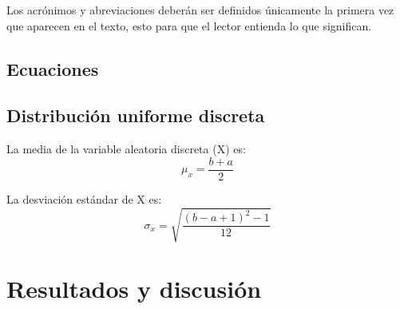     Los acrónimos y abreviaciones deberán ser definidos únicamente la primera vez que aparecen en el texto, esto para que el lector entienda lo que significan.
    
    \subsection{Ecuaciones}
    
    
    
    
    \subsection{Distribución uniforme discreta}
    La media de la variable aleatoria discreta (X) es:
    \begin{equation}
         \mu_x=\dfrac{b+a}{2}
    \end{equation}
    
    La desviación estándar de X es:
    \begin{equation}
         \sigma_x=\sqrt{\dfrac{(b-a+1)^2-1}{12}}
    \end{equation}
    
    
    \section{Resultados y discusión}
    
